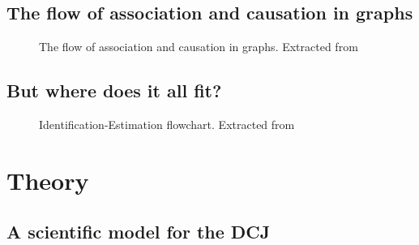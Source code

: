 \documentclass[
  authoryear,
  preprint,
  1p]{elsarticle}
\begin{document}
\subsection{The flow of association and causation in
graphs}\label{sec-framework-flow}

\begin{figure}


\caption{\label{fig-ACflow}The flow of association and causation in
graphs. Extracted from \citet[31]{Neal_2020}}

\end{figure}%

\subsection{But where does it all fit?}\label{sec-background-where}

\begin{figure}


\caption{\label{fig-IEflow}Identification-Estimation flowchart.
Extracted from \citet[32]{Neal_2020}}

\end{figure}%

\section{Theory}\label{sec-theory}

\subsection{A scientific model for the DCJ}\label{sec-theory-scientific}
\end{document}
